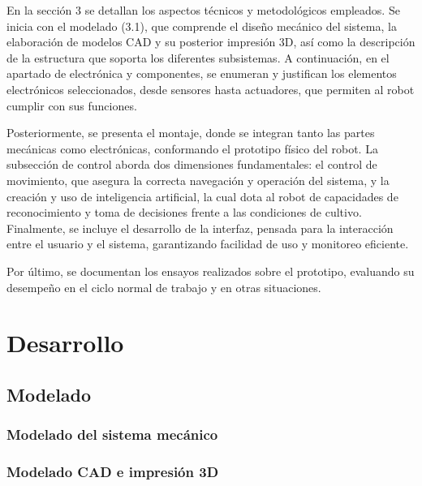 \documentclass[a4paper]{report}
\begin{document}
En la sección 3 se detallan los aspectos técnicos y metodológicos empleados. Se inicia con el modelado (3.1), que comprende el diseño mecánico del sistema, la elaboración de modelos CAD y su posterior impresión 3D, así como la descripción de la estructura que soporta los diferentes subsistemas. A continuación, en el apartado de electrónica y componentes, se enumeran y justifican los elementos electrónicos seleccionados, desde sensores hasta actuadores, que permiten al robot cumplir con sus funciones.

Posteriormente, se presenta el montaje, donde se integran tanto las partes mecánicas como electrónicas, conformando el prototipo físico del robot. La subsección de control aborda dos dimensiones fundamentales: el control de movimiento, que asegura la correcta navegación y operación del sistema, y la creación y uso de inteligencia artificial, la cual dota al robot de capacidades de reconocimiento y toma de decisiones frente a las condiciones de cultivo. Finalmente, se incluye el desarrollo de la interfaz, pensada para la interacción entre el usuario y el sistema, garantizando facilidad de uso y monitoreo eficiente.

Por último, se documentan los ensayos realizados sobre el prototipo, evaluando su desempeño en el ciclo normal de trabajo y en otras situaciones.
\chapter{Desarrollo}
\section{Modelado}
\subsection{Modelado del sistema mecánico}

\subsection{Modelado CAD e impresión 3D}

\end{document}
